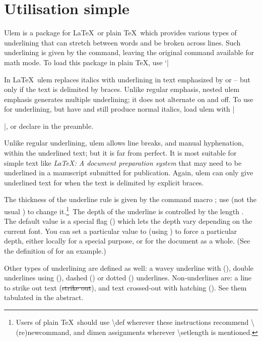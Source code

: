 \documentclass[12pt]{ltxdoc}
\begin{document}
\section{Utilisation simple}
\tradini
Ulem is a package for \LaTeX\ or plain \TeX\ which provides various types of
underlining that can stretch between words and be broken across lines.
Such underlining is given by the  command, leaving the original
 command available for math mode.
To load this package in plain \TeX, use `|

In \LaTeX\ ulem replaces italics with underlining in text emphasized
by  or  -- but only if the text is delimited by 
braces.  Unlike regular  emphasis, nested ulem emphasis generates
multiple underlining; it does not alternate on and off.
To use  for underlining, but have  and  still 
produce normal italics, load ulem with |\usepackage[normalem]{ulem}|, 
or declare  in the preamble.

Unlike regular underlining, ulem allows line breaks, and manual
hyphenation, within the underlined text; but it is far from perfect. It is
most suitable for simple text like {\em \LaTeX: A document preparation
system\/}  that may need to be underlined in a manuscript submitted for
publication.  Again, ulem can only give underlined text for  when 
the text is delimited by explicit braces.

The thickness of the underline rule is given by the command macro
; use  (not the usual 
) to change it.\footnote
{Users of plain \TeX\ should use \textbackslash def wherever these
instructions recommend \textbackslash(re)newcommand, and dimen
assignments wherever \textbackslash setlength is mentioned.}\,
The depth of the underline is controlled 
by the length .  The default value is a special flag 
() which lets the depth vary depending on the current font.
You can set a particular value to  (using ) to 
force a particular depth, either locally for a special purpose, or 
for the document as a whole.  (See the definition of  for an
example.)

Other types of underlining are defined as well:
a wavey underline with  (), double underlines 
using  (), dashed 
() or dotted  () underlines.  Non-underlines are: a line to strike out text 
(\sout{strike out}), and text crossed-out with hatching  
().  See them tabulated in the abstract.
\end{document}
